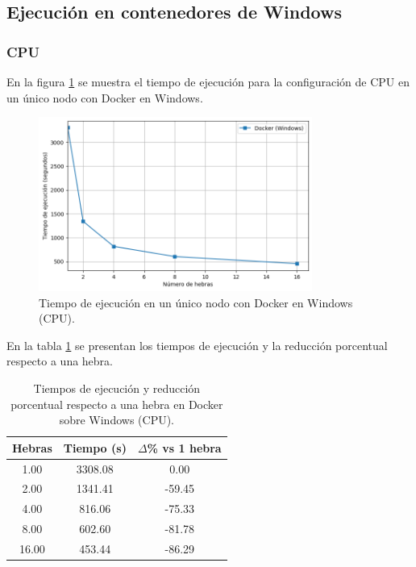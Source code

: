 \subsection{Ejecución en contenedores de Windows}
\subsubsection{CPU}

En la figura \ref{fig:single-node_windows_docker_time} se muestra el tiempo de ejecución para la configuración de CPU en un único nodo con Docker en Windows.

\begin{figure}[H]
    \centering
    \includegraphics[width=0.8\textwidth]{imagenes/cap5/single-node_windows_docker_time.png}
    \caption{Tiempo de ejecución en un único nodo con Docker en Windows (CPU).}
    \label{fig:single-node_windows_docker_time}
\end{figure}

En la tabla \ref{tab:single-node_windows_docker_time} se presentan los tiempos de ejecución y la reducción porcentual respecto a una hebra.

\begin{table}[ht]
    \centering
    \begin{tabular}{|c|c|c|}
        \hline
        \textbf{Hebras} & \textbf{Tiempo (s)} & \textbf{$\Delta$\% vs 1 hebra} \\
        \hline
        1.00            & 3308.08             & 0.00                           \\
        2.00            & 1341.41             & -59.45                         \\
        4.00            & 816.06              & -75.33                         \\
        8.00            & 602.60              & -81.78                         \\
        16.00           & 453.44              & -86.29                         \\
        \hline
    \end{tabular}
    \caption{Tiempos de ejecución y reducción porcentual respecto a una hebra en Docker sobre Windows (CPU).}
    \label{tab:single-node_windows_docker_time}
\end{table}

